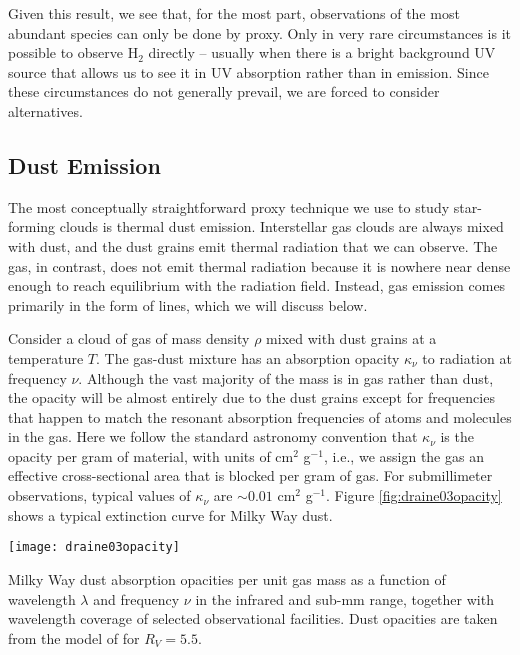 Given this result, we see that, for the most part, observations of the most abundant species can only be done by proxy. Only in very rare circumstances is it possible to observe H$_2$ directly -- usually when there is a bright background UV source that allows us to see it in UV absorption rather than in emission. Since these circumstances do not generally prevail, we are forced to consider alternatives.

\subsection{Dust Emission}

The most conceptually straightforward proxy technique we use to study star-forming clouds is thermal dust emission. Interstellar gas clouds are always mixed with dust, and the dust grains emit thermal radiation that we can observe. The gas, in contrast, does not emit thermal radiation because it is nowhere near dense enough to reach equilibrium with the radiation field. Instead, gas emission comes primarily in the form of lines, which we will discuss below.
  
Consider a cloud of gas of mass density $\rho$ mixed with dust grains at a temperature $T$. The gas-dust mixture has an absorption opacity $\kappa_{\nu}$ to radiation at frequency $\nu$. Although the vast majority of the mass is in gas rather than dust, the opacity will be almost entirely due to the dust grains except for frequencies that happen to match the resonant absorption frequencies of atoms and molecules in the gas. Here we follow the standard astronomy convention that $\kappa_{\nu}$ is the opacity per gram of material, with units of cm$^2$ g$^{-1}$, i.e., we assign the gas an effective cross-sectional area that is blocked per gram of gas. For submillimeter observations, typical values of $\kappa_{\nu}$ are $\sim 0.01$ cm$^{2}$ g$^{-1}$. Figure \ref{fig:draine03opacity} shows a typical extinction curve for Milky Way dust.

\begin{marginfigure}
\texttt{[image: draine03opacity]}
\caption[Dust absorption opacity]{
\label{fig:draine03opacity}
Milky Way dust absorption opacities per unit gas mass as a function of wavelength $\lambda$ and frequency $\nu$ in the infrared and sub-mm range, together with wavelength coverage of selected observational facilities. Dust opacities are taken from the model of \citet{draine03a} for $R_V = 5.5$.
}
\end{marginfigure}

